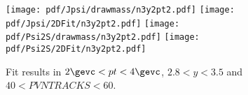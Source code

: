 \begin{figure}[H]
\begin{center}
\texttt{[image: pdf/Jpsi/drawmass/n3y2pt2.pdf]}
\texttt{[image: pdf/Jpsi/2DFit/n3y2pt2.pdf]}
\vspace*{-0.5cm}
\texttt{[image: pdf/Psi2S/drawmass/n3y2pt2.pdf]}
\texttt{[image: pdf/Psi2S/2DFit/n3y2pt2.pdf]}
\vspace*{-0.5cm}
\end{center}
\caption{Fit results in $2\gevc<pt<4\gevc$, $2.8<y<3.5$ and $40<PVNTRACKS<60$.}
\label{Fitn3y2pt2}
\end{figure}
